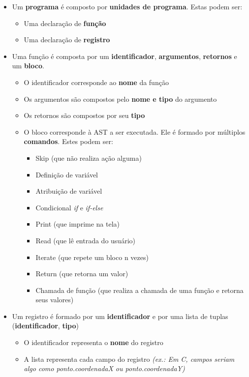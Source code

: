 \documentclass{article}
\begin{document}
\begin{itemize}
\begin{itemize}
        
    \end{itemize}
    
    \item Um \textbf{programa} é composto por \textbf{unidades de programa}. Estas podem ser:
    \begin{itemize}
        \item Uma declaração de \textbf{função}
        \item Uma declaração de \textbf{registro}
    \end{itemize}
    
    \item Uma função é composta por um \textbf{identificador}, \textbf{argumentos}, \textbf{retornos} e um \textbf{bloco}.
    \begin{itemize}
        \item O identificador corresponde ao \textbf{nome} da função
        \item Os argumentos são compostos pelo \textbf{nome e tipo} do argumento
        \item Os retornos são compostos por seu \textbf{tipo}
        \item O bloco corresponde à AST a ser executada. Ele é formado por múltiplos \textbf{comandos}. Estes podem ser:
        \begin{itemize}
            \item Skip (que não realiza ação alguma)
            \item Definição de variável
            \item Atribuição de variável
            \item Condicional \textit{if} e \textit{if-else}
            \item Print (que imprime na tela)
            \item Read (que lê entrada do usuário)
            \item Iterate (que repete um bloco n vezes)
            \item Return (que retorna um valor)
            \item Chamada de função (que realiza a chamada de uma função e retorna seus valores)
        \end{itemize}
    \end{itemize}
    
    \item Um registro é formado por um \textbf{identificador} e por uma lista de tuplas (\textbf{identificador}, \textbf{tipo})
    \begin{itemize}
        \item O identificador representa o \textbf{nome} do registro
        \item A lista representa cada campo do registro \textit{(ex.: Em C, campos seriam algo como ponto.coordenadaX ou ponto.coordenadaY)}
    \end{itemize}
    
\end{itemize}
\end{document}

